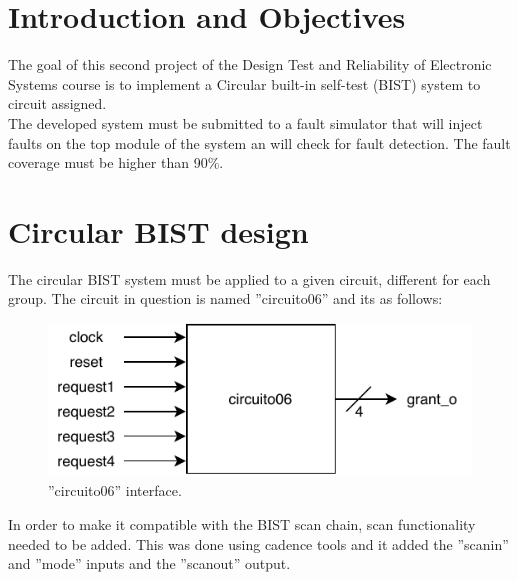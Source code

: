 \documentclass[12pt]{article}
\begin{document}
	\newpage

    \tableofcontents

	\newpage



	\section{Introduction and Objectives}
	The goal of this second project of the Design Test and Reliability of Electronic Systems course is to implement a Circular built-in self-test (BIST) system to circuit assigned.\\
	The developed system must be submitted to a fault simulator that will inject faults on the top module of the system an will check for fault detection. The fault coverage must be higher than 90\%.
	
	\section{Circular BIST design}
	The circular BIST system must be applied to a given circuit, different for each group. The circuit in question is named ''circuito06'' and its as follows: 
	\begin{figure}[!htb]
        \centering
        \includegraphics[scale=1]{circuito06.pdf}
            \caption{''circuito06'' interface.}
            \label{fig:ci}
    \end{figure}
    
    In order to make it compatible with the BIST scan chain, scan functionality needed to be added. This was done using cadence tools and it added the ''scan\textunderscore in'' and ''mode'' inputs and the ''scan\textunderscore out'' output.
    
\end{document}
